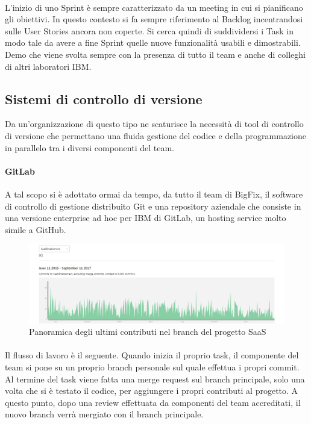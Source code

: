 \paragraph{}
L'inizio di uno Sprint è sempre caratterizzato da un meeting in cui si pianificano gli obiettivi. In questo contesto si fa sempre riferimento al Backlog incentrandosi sulle User Stories ancora non coperte. Si cerca quindi di suddividersi i Task in modo tale da avere a fine Sprint quelle nuove funzionalità usabili e dimostrabili. Demo che viene svolta sempre con la presenza di tutto il team e anche di colleghi di altri laboratori IBM.
\subsection{Sistemi di controllo di versione}
Da un'organizzazione di questo tipo ne scaturisce la necessità di tool di controllo di versione che permettano una fluida gestione del codice e della programmazione in parallelo tra i diversi componenti del team.
\paragraph{GitLab}
A tal scopo si è adottato ormai da tempo, da tutto il team di BigFix, il software di controllo di gestione distribuito Git e una repository aziendale che consiste in una versione enterprise ad hoc per IBM di GitLab, un hosting service molto simile a GitHub. 
\begin{figure}[h!]
	\centering
	\includegraphics[width=\textwidth,keepaspectratio=true]{capitoli/imgs/GitLabGraph.PNG}
	\caption{Panoramica degli ultimi contributi nel branch del progetto SaaS}
\end{figure}
\paragraph{}
Il flusso di lavoro è il seguente. Quando inizia il proprio task, il componente del team si pone su un proprio branch personale sul quale effettua i propri commit. Al termine del task viene fatta una merge request sul branch principale, solo una volta che si è testato il codice, per aggiungere i propri contributi al progetto. A questo punto, dopo una review effettuata da componenti del team accreditati, il nuovo branch verrà mergiato con il branch principale.
